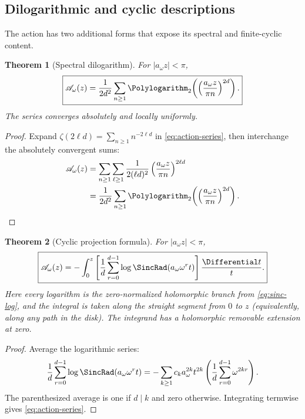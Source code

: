 \documentclass[11pt]{article}
\newtheorem{theorem}{Theorem}[section]
\theoremstyle{definition}
\newcommand{\Aact}{\mathscr A}
\begin{document}
\subsection{Dilogarithmic and cyclic descriptions}

The action has two additional forms that expose its spectral and finite-cyclic content.

\begin{theorem}[Spectral dilogarithm]
For $|a_\omega z|<\pi$,
\begin{equation}
 \boxed{
 \Aact_\omega(z)
 =\frac{1}{2d^2}\sum_{n\ge1}
 \Polylogarithm_2\!\left(
 \left(\frac{a_\omega z}{\pi n}\right)^{2d}
 \right).}
 \label{eq:spectral-dilog}
\end{equation}
The series converges absolutely and locally uniformly.
\end{theorem}

\begin{proof}
Expand $\zeta(2\ell d)=\sum_{n\ge1}n^{-2\ell d}$ in \cref{eq:action-series}, then interchange the absolutely convergent sums:
\begin{align*}
 \Aact_\omega(z)
 &=\sum_{n\ge1}\sum_{\ell\ge1}
 \frac1{2(\ell d)^2}
 \left(\frac{a_\omega z}{\pi n}\right)^{2\ell d}\\
 &=\frac1{2d^2}\sum_{n\ge1}
 \Polylogarithm_2\!\left(\left(\frac{a_\omega z}{\pi n}\right)^{2d}\right).
\end{align*}
\end{proof}

\begin{theorem}[Cyclic projection formula]
For $|a_\omega z|<\pi$,
\begin{equation}
 \boxed{
 \Aact_\omega(z)
 =-\int_0^z
 \left[
 \frac1d\sum_{r=0}^{d-1}
 \log\SincRad(a_\omega\omega^rt)
 \right]\frac{\Differential t}{t}.}
 \label{eq:cyclic-projection}
\end{equation}
Here every logarithm is the zero-normalized holomorphic branch from
\cref{eq:sinc-log}, and the integral is taken along the straight segment from
$0$ to $z$ (equivalently, along any path in the disk).  The integrand has a
holomorphic removable extension at zero.
\end{theorem}

\begin{proof}
Average the logarithmic series:
\[
 \frac1d\sum_{r=0}^{d-1}\log\SincRad(a_\omega\omega^rt)
 =-\sum_{k\ge1}c_ka_\omega^{2k}t^{2k}
 \left(\frac1d\sum_{r=0}^{d-1}\omega^{2kr}\right).
\]
The parenthesized average is one if $d\mid k$ and zero otherwise.  Integrating termwise gives \cref{eq:action-series}.
\end{proof}
\end{document}
